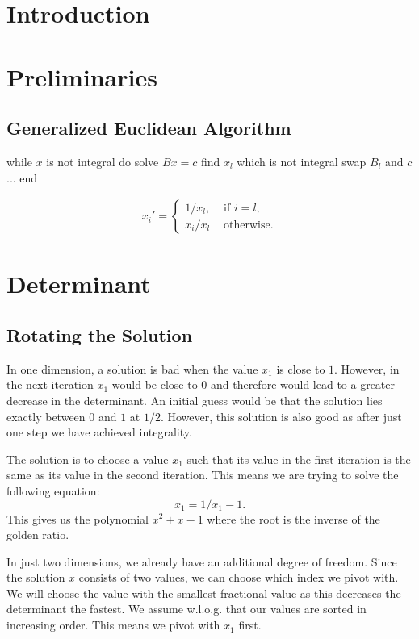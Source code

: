 \documentclass[english,version-2020-11]{uzl-thesis}
\begin{document}
\chapter{Introduction}

\chapter{Preliminaries}

\section{Generalized Euclidean Algorithm}

\begin{Pseudocode}
while $x$ is not integral do
  solve $Bx = c$
  find $x_l$ which is not integral
  swap $B_l$ and $c$
  ...
end
\end{Pseudocode}

\begin{align*}
  x_i' = \begin{cases}
    1 / x_l, & \text{ if } i = l, \\
    x_i / x_l & \text{ otherwise.}
  \end{cases}
\end{align*}

\chapter{Determinant}

\section{Rotating the Solution}

In one dimension, a solution is bad when the value $x_1$ is close to $1$.
However, in the next iteration $x_1$ would be close to $0$ and therefore
would lead to a greater decrease in the determinant.
An initial guess would be that the solution lies exactly between $0$ and $1$ at $1/2$.
However, this solution is also good as after just one step we have achieved integrality.

The solution is to choose a value $x_1$ such that its value in the first
iteration is the same as its value in the second iteration.
This means we are trying to solve the following equation:
\[
  x_1 = 1/x_1 - 1.
\]
This gives us the polynomial $x^2 + x - 1$ where the root is the inverse of the
golden ratio.

In just two dimensions, we already have an additional degree of freedom.
Since the solution $x$ consists of two values, we can choose which index we pivot with.
We will choose the value with the smallest fractional value as this decreases
the determinant the fastest.
We assume w.l.o.g. that our values are sorted in increasing order.
This means we pivot with $x_1$ first.
\end{document}
